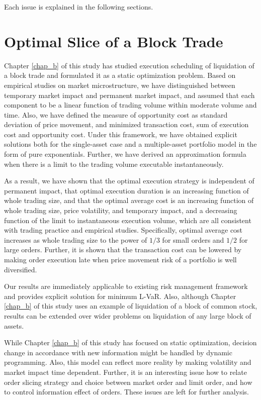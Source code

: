 \bigskip

Each issue is explained in the following sections.

\section{Optimal Slice of a Block Trade}\label{sec_c2}
Chapter \ref{chap_b} of this study has studied execution scheduling of liquidation of a block trade and formulated it as a static optimization problem.  Based on empirical studies on market microstructure, we have distinguished between temporary market impact and permanent market impact, and assumed that each component to be a linear function of trading volume within moderate volume and time.  Also, we have defined the measure of opportunity cost as standard deviation of price movement, and minimized transaction cost, sum of execution cost and opportunity cost.  Under this framework, we have obtained explicit solutions both for the single-asset case and a multiple-asset portfolio model in the form of pure exponentials.  Further, we have derived an approximation formula when there is a limit to the trading volume executable instantaneously.  

As a result, we have shown that the optimal execution strategy is independent of permanent impact, that optimal execution duration is an increasing function of whole trading size, and that the optimal average cost is an increasing function of whole trading size, price volatility, and temporary impact, and a decreasing function of the limit to instantaneous execution volume, which are all consistent with trading practice and empirical studies.  Specifically, optimal average cost increases as whole trading size to the power of $1/3$ for small orders and $1/2$ for large orders.  Further, it is shown that the transaction cost can be lowered by making order execution late when price movement risk of a portfolio is well diversified.

Our results are immediately applicable to existing risk management framework and provides explicit solution for minimum L-VaR.  Also, although Chapter \ref{chap_b} of this study uses an example of liquidation of a block of common stock, results can be extended over wider problems on liquidation of any large block of assets.

 While Chapter \ref{chap_b} of this study has focused on static optimization, decision change in accordance with new information might be handled by dynamic programming.  Also, this model can reflect more reality by making volatility and market impact time dependent.  Further, it is an interesting issue how to relate order slicing strategy and choice between market order and limit order, and how to control information effect of orders.  These issues are left for further analysis.

